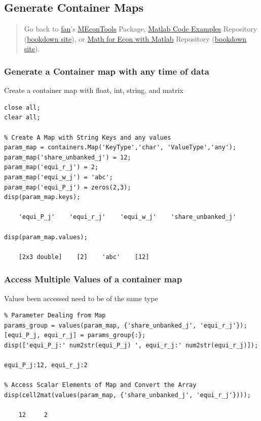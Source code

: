 \documentclass[
]{book}
\begin{document}
\hypertarget{generate-container-maps}{%
\subsection{Generate Container Maps}\label{generate-container-maps}}

\begin{quote}
Go back to \href{http://fanwangecon.github.io/}{fan}'s \href{https://fanwangecon.github.io/MEconTools/}{MEconTools} Package, \href{https://fanwangecon.github.io/M4Econ/}{Matlab Code Examples} Repository (\href{https://fanwangecon.github.io/M4Econ/bookdown}{bookdown site}), or \href{https://fanwangecon.github.io/Math4Econ/}{Math for Econ with Matlab} Repository (\href{https://fanwangecon.github.io/Math4Econ/bookdown}{bookdown site}).
\end{quote}

\hypertarget{generate-a-container-map-with-any-time-of-data}{%
\subsubsection{Generate a Container map with any time of data}\label{generate-a-container-map-with-any-time-of-data}}

Create a container map with float, int, string, and matrix

\begin{verbatim}
close all;
clear all;

% Create A Map with String Keys and any values
param_map = containers.Map('KeyType','char', 'ValueType','any');
param_map('share_unbanked_j') = 12;
param_map('equi_r_j') = 2;
param_map('equi_w_j') = 'abc';
param_map('equi_P_j') = zeros(2,3);
disp(param_map.keys);

    'equi_P_j'    'equi_r_j'    'equi_w_j'    'share_unbanked_j'

disp(param_map.values);

    [2x3 double]    [2]    'abc'    [12]
\end{verbatim}

\hypertarget{access-multiple-values-of-a-container-map}{%
\subsubsection{Access Multiple Values of a container map}\label{access-multiple-values-of-a-container-map}}

Values been accessed need to be of the same type

\begin{verbatim}
% Parameter Dealing from Map
params_group = values(param_map, {'share_unbanked_j', 'equi_r_j'});
[equi_P_j, equi_r_j] = params_group{:};
disp(['equi_P_j:' num2str(equi_P_j) ', equi_r_j:' num2str(equi_r_j)]);

equi_P_j:12, equi_r_j:2

% Access Scalar Elements of Map and Convert the Array
disp(cell2mat(values(param_map, {'share_unbanked_j', 'equi_r_j'})));

    12     2
\end{verbatim}
\end{document}
